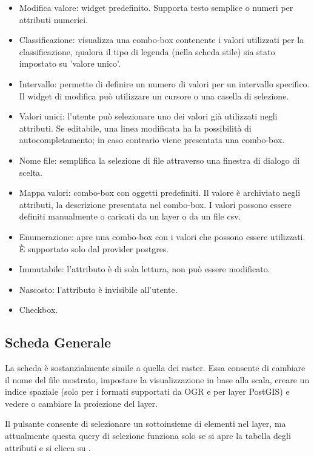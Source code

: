 \begin{itemize}
\item Modifica valore: widget predefinito. Supporta testo semplice o numeri per attributi numerici.
\item Classificazione: visualizza una combo-box contenente i valori utilizzati per la classificazione, 
qualora il tipo di legenda (nella scheda stile) sia stato impostato su 'valore unico'.
\item Intervallo: permette di definire un numero di valori per un intervallo specifico. Il widget 
di modifica può utilizzare un cursore o una casella di selezione.
\item Valori unici: l'utente può selezionare uno dei valori già utilizzati negli attributi. Se editabile, 
una linea modificata ha la possibilità di autocompletamento; in caso contrario viene presentata una combo-box.
\item Nome file: semplifica la selezione di file attraverso una finestra di dialogo di scelta.
\item Mappa valori: combo-box con oggetti predefiniti. Il valore è archiviato negli attributi, la descrizione 
presentata nel combo-box. I valori possono essere definiti manualmente o caricati da un layer o da un file csv.
\item Enumerazione: apre una combo-box con i valori che possono essere utilizzati. È supportato solo dal 
provider postgres.
\item Immutabile: l'attributo è di sola lettura, non può essere modificato.
\item Nascosto: l'attributo è invisibile all'utente.
\item Checkbox.
\end{itemize}

\subsection{Scheda Generale}\label{vectorgeneraltab}

La scheda  è sostanzialmente simile a quella dei raster. Essa 
consente di cambiare il nome del file mostrato, impostare la visualizzazione
in base alla scala, creare un indice spaziale (solo per i formati supportati
da OGR e per layer PostGIS) e vedere o cambiare la proiezione del layer.

Il pulsante  consente di selezionare un sottoinsieme
di elementi nel layer, ma attualmente questa query di selezione funziona solo 
se si apre la tabella degli attributi e si clicca su .

